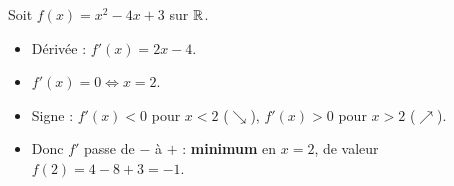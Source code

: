 \begin{exemplebox}
Soit $f(x)=x^2-4x+3$ sur $\mathbb{R}$.
\begin{itemize}[leftmargin=6mm,itemsep=1pt]
  \item Dérivée : $f'(x)=2x-4$.
  \item $f'(x)=0 \iff x=2$.
  \item Signe : $f'(x)<0$ pour $x<2$ ($\searrow$), $f'(x)>0$ pour $x>2$ ($\nearrow$).
  \item Donc $f'$ passe de $-$ à $+$ : \textbf{minimum} en $x=2$, de valeur $f(2)=4-8+3=-1$.
\end{itemize}
\end{exemplebox}


